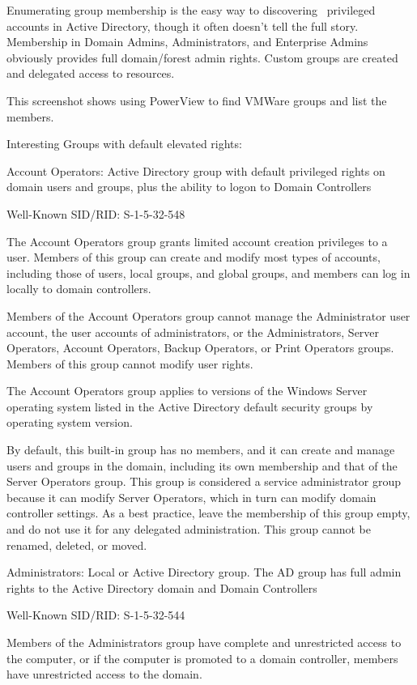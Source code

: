 Enumerating group membership is the easy way to discovering  privileged accounts in Active Directory, though it often doesn’t tell the full story.  Membership in Domain Admins, Administrators, and Enterprise Admins obviously provides full domain/forest admin rights. Custom groups are created and delegated access to resources.

This screenshot shows using PowerView to find VMWare groups and list the members.

Interesting Groups with default elevated rights:

Account Operators: Active Directory group with default privileged rights on domain users and groups, plus the ability to logon to Domain Controllers

Well-Known SID/RID: S-1-5-32-548

The Account Operators group grants limited account creation privileges to a user. Members of this group can create and modify most types of accounts, including those of users, local groups, and global groups, and members can log in locally to domain controllers.

Members of the Account Operators group cannot manage the Administrator user account, the user accounts of administrators, or the Administrators, Server Operators, Account Operators, Backup Operators, or Print Operators groups. Members of this group cannot modify user rights.

The Account Operators group applies to versions of the Windows Server operating system listed in the Active Directory default security groups by operating system version.

By default, this built-in group has no members, and it can create and manage users and groups in the domain, including its own membership and that of the Server Operators group. This group is considered a service administrator group because it can modify Server Operators, which in turn can modify domain controller settings. As a best practice, leave the membership of this group empty, and do not use it for any delegated administration. This group cannot be renamed, deleted, or moved.

Administrators: Local or Active Directory group. The AD group has full admin rights to the Active Directory domain and Domain Controllers

Well-Known SID/RID: S-1-5-32-544

Members of the Administrators group have complete and unrestricted access to the computer, or if the computer is promoted to a domain controller, members have unrestricted access to the domain.

